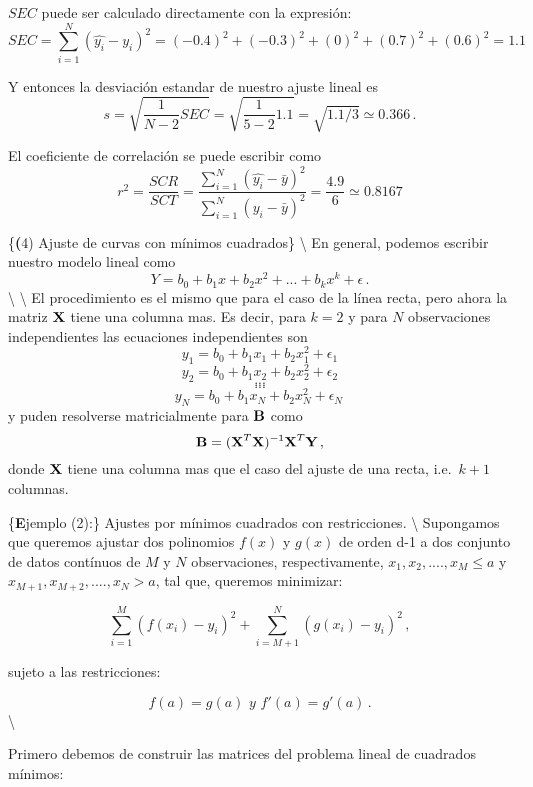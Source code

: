 \documentclass[
]{agujournal2019}
\begin{document}
\noindent \(SEC\) puede ser calculado directamente con la expresión:
\[SEC=\sum \limits^N_{i=1}(\hat{y_i}-y_i)^2=
   (-0.4)^2 + (-0.3)^2+(0)^2 + (0.7)^2 + (0.6)^2=1.1\]

\noindent Y entonces la desviación estandar de nuestro ajuste lineal es
\[s=\sqrt{\frac{1}{N-2}SEC}=\sqrt{\frac{1}{5-2}1.1}=\sqrt{1.1/3}\simeq0.366\,.\]

\noindent El coeficiente de correlación se puede escribir como
\[r^2=\frac{SCR}{SCT}=\frac{\sum\limits^N_{i=1}(\hat{y_i}-\bar{y})^2}{\sum\limits^N_{i=1}
({y_i}-\bar{y})^2}=\frac{4.9}{6}\simeq0.8167\]

\vspace{0.5cm}

\{\noindent \textbf (4) Ajuste de curvas con mínimos cuadrados\}
\textbackslash{} \noindent En general, podemos escribir nuestro modelo
lineal como \[Y=b_0 + b_1x + b_2 x^2 + ... + b_k x^k + \epsilon\,.\]
\textbackslash{} \textbackslash{} \noindent El procedimiento es el mismo
que para el caso de la línea recta, pero ahora la matriz \({\textbf X}\)
tiene una columna mas. Es decir, para \(k=2\) y para \(N\) observaciones
independientes las ecuaciones independientes son
\[y_1=b_0 + b_1x_1 + b_2 x_1^2 + \epsilon_1\]
\[y_2=b_0 + b_1x_2 + b_2 x_2^2 + \epsilon_2\] \[...\] \[...\] \[...\]
\[y_N=b_0 + b_1x_N + b_2 x_N^2 + \epsilon_N\,\] y puden resolverse
matricialmente para \({\textbf B}\) como
\[{\textbf B}=({\textbf X}^T{\textbf X})^{-1}{\textbf X}^T{\textbf Y}\,,\]
donde \({\textbf X}\) tiene una columna mas que el caso del ajuste de
una recta, i.e.~\(k+1\) columnas.

\vspace{0.5cm}

\{\noindent \textbf Ejemplo (2):\} Ajustes por mínimos cuadrados con
restricciones. \textbackslash{} \noindent Supongamos que queremos
ajustar dos polinomios \(f(x)\) y \(g(x)\) de orden d-1 a dos conjunto
de datos contínuos de \(M\) y \(N\) observaciones, respectivamente,
\(x_1, x_2, ....,x_M\leq a\) y \(x_{M+1}, x_{M+2}, ....,x_N>a\), tal
que, queremos minimizar:

\[\sum\limits^M_{i=1}(f(x_i)-y_i)^2 + \sum\limits^N_{i=M+1}(g(x_i)-y_i)^2\,,\]

sujeto a las restricciones:

\[f(a)=g(a)\,\,y\,\,f'(a)=g'(a)\,.\]\textbackslash{}

Primero debemos de construir las matrices del problema lineal de
cuadrados mínimos:
\end{document}
